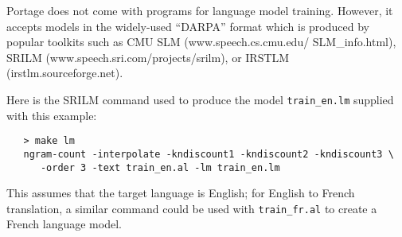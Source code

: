 \documentclass[11pt]{article}
\begin{document}
Portage does not come with programs for language model training. However,
it accepts models in the widely-used ``DARPA'' format which is produced by popular
toolkits such as CMU SLM (www.speech.cs.cmu.edu/ SLM\_info.html), SRILM
(www.speech.sri.com/projects/srilm), or IRSTLM (irstlm.sourceforge.net).

Here
is the SRILM command used to produce the model {\tt train\_en.lm} supplied with
this example:
\begin{verbatim}
   > make lm
   ngram-count -interpolate -kndiscount1 -kndiscount2 -kndiscount3 \
      -order 3 -text train_en.al -lm train_en.lm
\end{verbatim}
This assumes that the target language is English; for English to French
translation, a similar command could be used with {\tt train\_fr.al} to create
a French language model.
\end{document}

